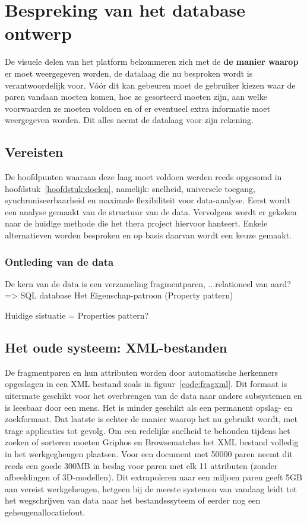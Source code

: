 \chapter{Bespreking van het database ontwerp}
\label{hoofdstuk:database}
De visuele delen van het platform bekommeren zich met de \textbf{de manier waarop} er moet weergegeven worden, de datalaag die nu besproken wordt is verantwoordelijk voor. V\'o\'or dit kan gebeuren moet de gebruiker kiezen waar de paren vandaan moeten komen, hoe ze gesorteerd moeten zijn, aan welke voorwaarden ze moeten voldoen en of er eventueel extra informatie moet weergegeven worden. Dit alles neemt de datalaag voor zijn rekening.

\section{Vereisten}
De hoofdpunten waaraan deze laag moet voldoen werden reeds opgesomd in hoofdstuk~\ref{hoofdstuk:doelen}, namelijk: snelheid, universele toegang, synchroniseerbaarheid en maximale flexibiliteit voor data-analyse. Eerst wordt een analyse gemaakt van de structuur van de data. Vervolgens wordt er gekeken naar de huidige methode die het thera project hiervoor hanteert. Enkele alternatieven worden besproken en op basis daarvan wordt een keuze gemaakt.

\subsection{Ontleding van de data}
De kern van de data is een verzameling fragmentparen,
...relationeel van aard? => SQL database
Het Eigenschap-patroon (Property pattern)

Huidige sistuatie = Properties pattern? %


\section{Het oude systeem: XML-bestanden}
De fragmentparen en hun attributen worden door automatische herkenners opgeslagen in een XML bestand zoals in figuur~\ref{code:fragxml}. Dit formaat is uitermate geschikt voor het overbrengen van de data naar andere subsystemen en is leesbaar door een mens. Het is minder geschikt als een permanent opslag- en zoekformaat. Dat laatste is echter de manier waarop het nu gebruikt wordt, met trage applicaties tot gevolg. Om een redelijke snelheid te behouden tijdens het zoeken of sorteren moeten Griphos en Browsematches het XML bestand volledig in het werkgegheugen plaatsen. Voor een document met 50000 paren neemt dit reeds een goede 300MB in beslag voor paren met elk 11 attributen (zonder afbeeldingen of 3D-modellen). Dit extrapoleren naar een miljoen paren geeft 5GB aan vereist werkgeheugen, hetgeen bij de meeste systemen van vandaag leidt tot het wegschrijven van data naar het bestandsssyteem of eerder nog een geheugenallocatiefout.\\

